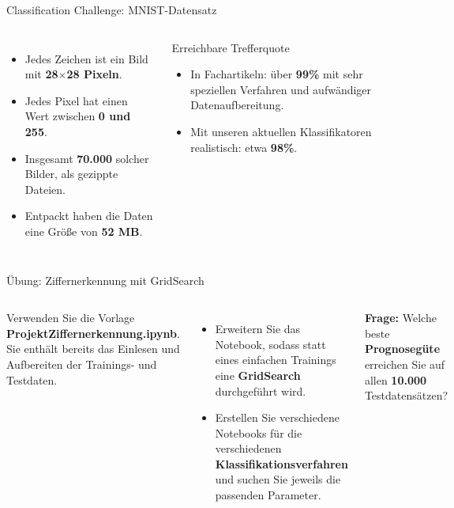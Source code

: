 \begin{frame}{Classification Challenge: MNIST-Datensatz}
\begin{columns}
\begin{itemize}
  \item Jedes Zeichen ist ein Bild mit \textbf{28$\times$28 Pixeln}.
  \item Jedes Pixel hat einen Wert zwischen \textbf{0 und 255}.
  \item Insgesamt \textbf{70.000} solcher Bilder, als gezippte Dateien.
  \item Entpackt haben die Daten eine Größe von \textbf{52 MB}.
\end{itemize}

\begin{blockC1}{Erreichbare Trefferquote}
\begin{itemize}
  \item In Fachartikeln: über \textbf{99\%} mit sehr speziellen Verfahren
        und aufwändiger Datenaufbereitung.
  \item Mit unseren aktuellen Klassifikatoren realistisch: etwa \textbf{98\%}.
\end{itemize}
\end{blockC1}
\end{columns}
\end{frame}

\begin{frame}{Übung: Ziffernerkennung mit GridSearch}
\begin{columns}
Verwenden Sie die Vorlage \textbf{ProjektZiffernerkennung.ipynb}. Sie
enthält bereits das Einlesen und Aufbereiten der Trainings- und Testdaten.

\vspace{0.4em}
\begin{itemize}
  \item Erweitern Sie das Notebook, sodass statt eines einfachen Trainings
        eine \textbf{GridSearch} durchgeführt wird.
  \item Erstellen Sie verschiedene Notebooks für die verschiedenen
        \textbf{Klassifikationsverfahren} und suchen Sie jeweils die passenden
        Parameter.
\end{itemize}

\vspace{0.4em}
\textbf{Frage:} Welche beste \textbf{Prognosegüte} erreichen Sie auf allen
\textbf{10.000} Testdatensätzen?

\centering
{}
\end{columns}
\end{frame}

\makequizpage{\QUIZURL}{\QUIZQRCODE}{\QUIZIMAGE}
\makequestionspage{\FRAGENIMAGE}